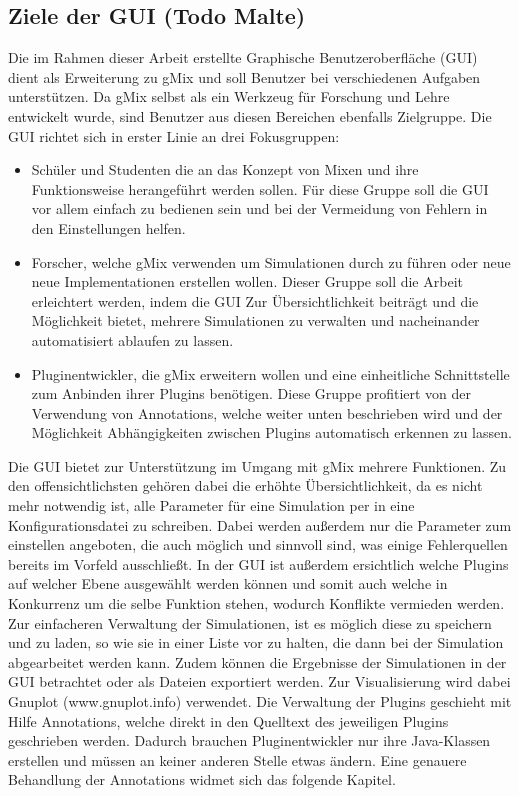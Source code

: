 \documentclass[a4paper, 11pt]{article} %
\begin{document}
\subsection{Ziele der GUI (Todo Malte)} %
\label{sub:ziele_der_gui}
Die im Rahmen dieser Arbeit erstellte Graphische Benutzeroberfläche (GUI) dient als Erweiterung zu gMix und soll Benutzer bei verschiedenen Aufgaben unterstützen. Da gMix selbst als ein Werkzeug für Forschung und Lehre entwickelt wurde, sind Benutzer aus diesen Bereichen ebenfalls Zielgruppe. Die GUI richtet sich in erster Linie an drei Fokusgruppen:\\
\begin{itemize}
	\item Schüler und Studenten die an das Konzept von Mixen und ihre Funktionsweise herangeführt werden sollen. Für diese Gruppe soll die GUI vor allem einfach zu bedienen sein und bei der Vermeidung von Fehlern in den Einstellungen helfen.
	\item Forscher, welche gMix verwenden um Simulationen durch zu führen oder neue neue Implementationen erstellen wollen. Dieser Gruppe soll die Arbeit erleichtert werden, indem die GUI Zur Übersichtlichkeit beiträgt und die Möglichkeit bietet, mehrere Simulationen zu verwalten und nacheinander automatisiert ablaufen zu lassen.
	\item Pluginentwickler, die gMix erweitern wollen und eine einheitliche Schnittstelle zum Anbinden ihrer Plugins benötigen. Diese Gruppe profitiert von der Verwendung von Annotations, welche weiter unten beschrieben wird und der Möglichkeit Abhängigkeiten zwischen Plugins automatisch erkennen zu lassen.
\end{itemize}

Die GUI bietet zur Unterstützung im Umgang mit gMix mehrere Funktionen. Zu den offensichtlichsten gehören dabei die erhöhte Übersichtlichkeit, da es nicht mehr notwendig ist, alle Parameter für eine Simulation per in eine Konfigurationsdatei zu schreiben. Dabei werden außerdem nur die Parameter zum einstellen angeboten, die auch möglich und sinnvoll sind, was einige Fehlerquellen bereits im Vorfeld ausschließt. In der GUI  ist außerdem ersichtlich welche Plugins auf welcher Ebene ausgewählt werden können und somit auch welche in Konkurrenz um die selbe Funktion stehen, wodurch Konflikte vermieden werden. Zur einfacheren Verwaltung der Simulationen, ist es möglich diese zu speichern und zu laden, so wie sie in einer Liste vor zu halten, die dann bei der Simulation abgearbeitet werden kann. Zudem können die Ergebnisse der Simulationen in der GUI betrachtet oder als Dateien exportiert werden. Zur Visualisierung wird dabei Gnuplot (www.gnuplot.info) verwendet. Die Verwaltung der Plugins geschieht mit Hilfe Annotations, welche direkt in den Quelltext des jeweiligen Plugins geschrieben werden. Dadurch brauchen Pluginentwickler nur ihre Java-Klassen erstellen und müssen an keiner anderen Stelle etwas ändern. Eine genauere Behandlung der Annotations widmet sich das folgende Kapitel.
\end{document}

